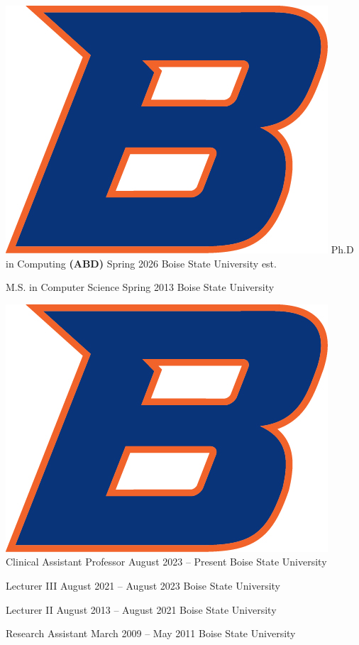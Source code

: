 \documentclass{shanep}
\begin{document}

\begin{itemize}

  \ressubheading
      {\includegraphics[scale=.2]{bsu.jpg}}
      {Ph.D in Computing \textbf{(ABD)}}
      {Spring 2026}
      {Boise State University}
      {est.}

  \ressubheading
      {}
      {M.S. in Computer Science}
      {Spring 2013}
      {Boise State University}
      {}

\end{itemize} %

\begin{itemize}
  \ressubheading
      {\includegraphics[scale=.2]{bsu.jpg}}
      {Clinical Assistant Professor}
      {August 2023 -- Present}
      {Boise State University}
      {}

  \ressubheading
      {}
      {Lecturer III}
      {August 2021 -- August 2023}
      {Boise State University}
      {}

  \ressubheading
      {}
      {Lecturer II}
      {August 2013 -- August 2021}
      {Boise State University}
      {}

  \ressubheading
      {}
      {Research Assistant}
      {March 2009 -- May 2011}
      {Boise State University}
      {}

\end{itemize}
\end{document}
